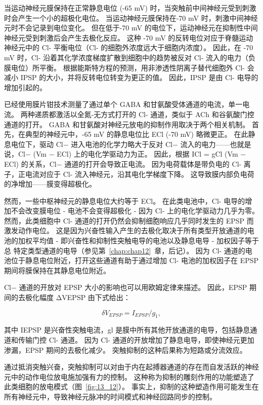 当运动神经元膜保持在正常静息电位 (-65 mV) 时，当突触前中间神经元受到刺激时会产生一个小的超极化电位。
当运动神经元膜保持在-70 mV 时，刺激中间神经元时不会记录到电位变化。
但在低于-70 mV 的电位下，运动神经元在抑制性中间神经元受到刺激后会产生去极化反应。
这种 -70 mV 的反转电位对应于脊髓运动神经元中的 Cl- 平衡电位（Cl- 的细胞外浓度远大于细胞内浓度）。
因此，在 -70 mV 时，Cl- 沿着其化学浓度梯度扩散到细胞中的趋势被反对 Cl- 流入的电力（负膜电位）所平衡。
根据能斯特方程的预测，用非渗透性阴离子替代细胞外 Cl- 会减小 IPSP 的大小，并将反转电位转变为更正的值。
因此，IPSP 是由 Cl- 电导的增加引起的。


已经使用膜片钳技术测量了通过单个 GABA 和甘氨酸受体通道的电流，单一电流。
两种递质都激活以全氮-无方式打开的 Cl- 通道，类似于 ACh 和谷氨酸门控通道的打开。
GABA 和甘氨酸对神经元放电的抑制作用取决于两个相关机制。
首先，在典型的神经元中，-65 mV 的静息电位比 ECl (-70 mV) 略微更正。
在此静息电位下，驱动 Cl− 进入电池的化学力略大于反对 Cl− 流入的电力——也就是说，Cl− (Vm − ECl) 上的电化学驱动力为正。
因此，根据 ICl = gCl (Vm − ECl) 的关系，Cl− 通道的打开会导致正电流。 因为电荷载体是带负电的 Cl- 离子，正电流对应于 Cl- 流入神经元，沿其电化学梯度下降。
这导致膜内部负电荷的净增加——膜变得超极化。


然而，一些中枢神经元的静息电位大约等于 ECl。 在此类电池中，Cl- 电导的增加不会改变膜电位 - 电池不会变得超极化 - 因为 Cl- 上的电化学驱动力几乎为零。
然而，此类细胞中 Cl- 通道的打开仍然会抑制细胞响应几乎同时发生的 EPSP 而激发动作电位。
这是因为兴奋性输入产生的去极化取决于所有类型开放通道的电池的加权平均值 - 即兴奋性和抑制性突触电导的电池以及静息电导 - 加权因子等于总 特定类型通道的电导（参见第~\ref{chap:chap12}~章，后记）。
因为 Cl- 通道的电池位于静息电位附近，打开这些通道有助于通过增加 Cl- 电池的加权因子在 EPSP 期间将膜保持在其静息电位附近。


Cl− 通道的开放对 EPSP 大小的影响也可以用欧姆定律来描述。
因此，EPSP 期间的去极化幅度 ΔVEPSP 由下式给出：


\begin{equation}\label{depolarization_amplitude}
	\delta V_{EPSP} = I_{EPSP} / g_1,
\end{equation}


其中 IEPSP 是兴奋性突触电流，gl 是膜中所有其他开放通道的电导，包括静息通道和传输门控 Cl- 通道。 因为 Cl- 通道的开放增加了静息电导，即使神经元更加渗漏，EPSP 期间的去极化减少。
突触抑制的这种后果称为短路或分流效应。


通过抵消突触兴奋，突触抑制可以对由于内在起搏器通道的存在而自发活跃的神经元中的动作电位放电施加强有力的控制。
这种称为抑制的雕刻作用的功能塑造了此类细胞的放电模式（图~\ref{fig:13_12}）。 
事实上，抑制的这种塑造作用可能发生在所有神经元中，导致神经元脉冲的时间模式和神经回路同步的控制。


